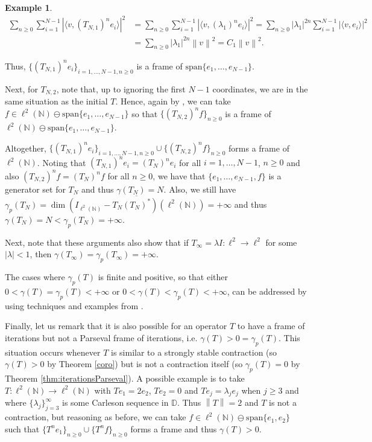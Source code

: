\documentclass[a4paper,12pt]{amsart}
\def\D{{\mathbb{D}}}
\def\N{{\mathbb{N}}}
\newcommand{\norm}[1]{{\left\|{#1}\right\|}}
\newcommand{\abs}[1]{{\left|{#1}\right|}}
\newcommand{\scal}[1]{{\langle{#1}\rangle}}
\theoremstyle{definition}
\newtheorem{example}[theorem]{Example}
\begin{document}
\begin{example}
\begin{align*}
\sum_{n\geqslant0}\sum_{i=1}^{N-1}\abs{\scal{v,(T_{N,1})^ne_i}}^2&=\sum_{n\geqslant0}\sum_{i=1}^{N-1}\abs{\scal{v,(\lambda_1)^ne_i}}^2=\sum_{n\geqslant0}\abs{\lambda_1}^{2n}\sum_{i=1}^{N-1}\abs{\scal{v,e_i}}^2
\\
&=\sum_{n\geqslant0}\abs{\lambda_1}^{2n}\norm{v}^2=C_1\norm{v}^2.
\end{align*}

Thus, $\{(T_{N,1})^ne_i\}_{i=1,\dots,N-1,n\geqslant0}$ is a frame of $\text{span}\{e_1,\dots,e_{N-1}\}$.

Next, for $T_{N,2}$, note that, up to ignoring the first $N-1$ coordinates, we are in the same situation as the initial $T$. Hence, again by \cite{ACMT}, we can take $f\in\ell^2(\N)\ominus\text{span}\{e_1,\dots,e_{N-1}\}$ so that $\{(T_{N,2})^nf\}_{n\geqslant0}$ is a frame of $\ell^2(\N)\ominus\text{span}\{e_1,\dots,e_{N-1}\}$. 

Altogether, $\{(T_{N,1})^ne_i\}_{i=1,\dots,N-1,n\geqslant0}\cup\{(T_{N,2})^nf\}_{n\geqslant0}$ forms a frame of $\ell^2(\N)$. Noting that $(T_{N,1})^ne_i=(T_N)^ne_i$ for all $i=1,\dots,N-1$, $n\geqslant0$ and also $(T_{N,2})^nf=(T_N)^nf$ for all $n\geqslant0$, we have that $\{e_1,\dots,e_{N-1},f\}$ is a generator set for $T_N$ and thus $\gamma(T_N)=N$. Also, we still have $\gamma_p(T_N)=\dim\overline{(I_{\ell^2(\N)}-T_N(T_N)^*)(\ell^2(\N))}=+\infty$ and thus $\gamma(T_N)=N<\gamma_p(T_N)=+\infty$.

Next, note that these arguments also show that if $T_{\infty}=\lambda I:\ell^2\to\ell^2$ for some $\abs{\lambda}<1$, then $\gamma(T_{\infty})=\gamma_p(T_{\infty})=+\infty$.

The cases where $\gamma_p(T)$ is finite and positive, so that either $0<\gamma(T)=\gamma_p(T)<+\infty$ or $0<\gamma(T)<\gamma_p(T)<+\infty$, can be addressed by using techniques and examples from \cite{CMS}.

Finally, let us remark that it is also possible for an operator $T$ to have a frame of iterations but not a Parseval frame of iterations, i.e. $\gamma(T)>0=\gamma_p(T)$. This situation occurs whenever $T$ is similar to a strongly stable contraction (so $\gamma(T)>0$ by Theorem \ref{coro}) but is not a contraction itself (so $\gamma_p(T)=0$ by Theorem \ref{thm:iterationsParseval}). A possible example is to take $T:\ell^2(\N)\to\ell^2(\N)$ with $Te_1=2e_2$, $Te_2=0$ and $Te_j=\lambda_je_j$ when $j\geqslant3$ and where $\{\lambda_j\}_{j=3}^\infty$ is some Carleson sequence in $\D$. Thus $\norm{T}=2$ and $T$ is not a contraction, but reasoning as before, we can take $f\in\ell^2(\N)\ominus\text{span}\{e_1,e_2\}$ such that $\{T^ne_1\}_{n\geqslant0}\cup\{T^nf\}_{n\geqslant0}$ forms a frame and thus $\gamma(T)>0$.
\end{example}
\end{document}
